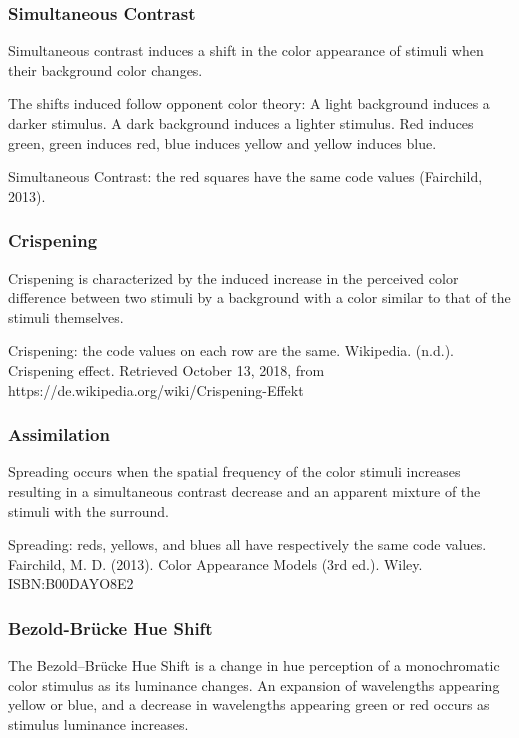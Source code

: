 \subsubsection{Simultaneous Contrast}%
\label{subsubsec:simultaneous-contrast}
Simultaneous contrast induces a shift in the color appearance of stimuli when their background color changes.

The shifts induced follow opponent color theory:
A light background induces a darker stimulus.
A dark background induces a lighter stimulus.
Red induces green, green induces red, blue induces yellow and yellow induces blue.

Simultaneous Contrast: the red squares have the same code values (Fairchild, 2013).

\subsubsection{Crispening}%
\label{subsubsec:crispening}

Crispening is characterized by the induced increase in the perceived color difference between two stimuli by a background with a color similar to that of the stimuli themselves.

Crispening: the code values on each row are the same.
Wikipedia. (n.d.). Crispening effect. Retrieved October 13, 2018, from https://de.wikipedia.org/wiki/Crispening-Effekt

\subsubsection{Assimilation}%
\label{subsubsec:assimilation}

Spreading occurs when the spatial frequency of the color stimuli increases resulting in a simultaneous contrast decrease and an apparent mixture of the stimuli with the surround.

Spreading: reds, yellows, and blues all have respectively the same code values.
Fairchild, M. D. (2013). Color Appearance Models (3rd ed.). Wiley. ISBN:B00DAYO8E2

\subsubsection{Bezold-Brücke Hue Shift}%
\label{subsubsec:bezold-brucke-hue-shift}

The Bezold–Brücke Hue Shift is a change in hue perception of a monochromatic color stimulus as its luminance changes. An expansion of wavelengths appearing yellow or blue, and a decrease in wavelengths appearing green or red occurs as stimulus luminance increases.

